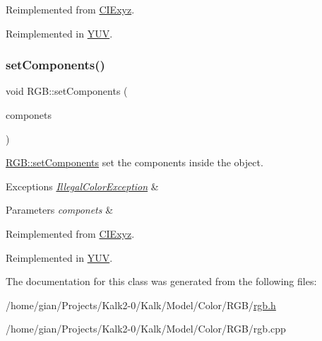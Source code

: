 Reimplemented from \hyperlink{class_c_i_exyz_abb3f5e1c8a923d7758e6bbe83b71f4fa}{C\+I\+Exyz}.



Reimplemented in \hyperlink{class_y_u_v_a1b9300c00323eca16fc4bb028964e85f}{Y\+UV}.

\mbox{\label{class_r_g_b_acf213178f2029a5f304d62b87dbb6b36}} 
\subsubsection{\texorpdfstring{set\+Components()}{setComponents()}}
{\footnotesize\ttfamily void R\+G\+B\+::set\+Components (\begin{DoxyParamCaption}\item[{Q\+Vector$<$ double $>$}]{componets }\end{DoxyParamCaption})\hspace{0.3cm}{\ttfamily [virtual]}}



\hyperlink{class_r_g_b_acf213178f2029a5f304d62b87dbb6b36}{R\+G\+B\+::set\+Components} set the components inside the object. 


\begin{DoxyExceptions}{Exceptions}
{\em \hyperlink{class_illegal_color_exception}{Illegal\+Color\+Exception}} & \\
\hline
\end{DoxyExceptions}

\begin{DoxyParams}{Parameters}
{\em componets} & \\
\hline
\end{DoxyParams}


Reimplemented from \hyperlink{class_c_i_exyz_a11468574f91d2cb1356f0cde56429b84}{C\+I\+Exyz}.



Reimplemented in \hyperlink{class_y_u_v_a622daf7a688da4a227b63deb412c0d46}{Y\+UV}.



The documentation for this class was generated from the following files\+:\begin{DoxyCompactItemize}
\item 
/home/gian/\+Projects/\+Kalk2-\/0/\+Kalk/\+Model/\+Color/\+R\+G\+B/\hyperlink{rgb_8h}{rgb.\+h}\item 
/home/gian/\+Projects/\+Kalk2-\/0/\+Kalk/\+Model/\+Color/\+R\+G\+B/rgb.\+cpp\end{DoxyCompactItemize}
